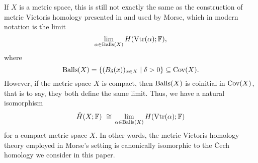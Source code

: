 If $X$ is a metric space, this is still not exactly the same as the construction of metric Vietoris homology presented in \cite{Vietoris.1927} and used by Morse, which in modern notation is the limit
\begin{equation*}
\lim_{\alpha \in \operatorname{Balls}(X)} H (\operatorname{Vtr} (\alpha); \mathbb{F}),
\end{equation*}
where 
\begin{equation*}
\operatorname{Balls} (X) = \left\{ ( B_{\delta} (x) )_{x \in X} \mid \delta > 0 \right\}
\subseteq \operatorname{Cov} (X).
\end{equation*}
However, if the metric space $X$ is compact, then $\operatorname{Balls} (X)$ is coinitial in $\operatorname{Cov} (X)$, that is to say, they both define the same limit.
Thus, we have a natural isomorphism
\begin{equation*}
\check{H} (X; \mathbb{F}) \ \cong \,
\lim_{\alpha \in \operatorname{Balls}(X)} H (\operatorname{Vtr} (\alpha); \mathbb{F})
\end{equation*}
for a compact metric space $X$.
In other words, the metric Vietoris homology theory employed in Morse's setting is canonically isomorphic to the \v{C}ech homology we consider in this paper.
